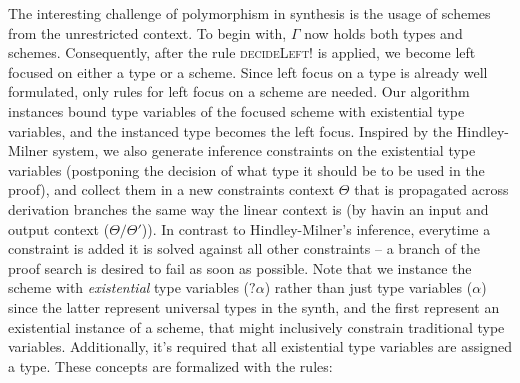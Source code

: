 \documentclass{llncs}
\begin{document}
The interesting challenge of polymorphism in synthesis is the usage of
schemes from the unrestricted context.  To begin with, $\Gamma$ now
holds both types and schemes. Consequently, after the rule
\textsc{decideLeft!} is applied, we become left focused on either a
type or a scheme. Since left focus on a type is already well
formulated, only rules for left focus on a scheme are needed. Our
algorithm instances bound type variables of the focused scheme with
existential type variables, and the instanced type becomes the left
focus. Inspired by the Hindley-Milner system, we also generate
inference constraints on the existential type variables (postponing
the decision of what type it should be to be used in the proof), and
collect them in a new constraints context $\Theta$ that is propagated
across derivation branches the same way the linear context is (by
havin an input and output context ($\Theta/\Theta'$)).  In contrast to
Hindley-Milner's inference, everytime a constraint is added it is solved against all other
constraints -- a branch of the proof search is desired to fail as soon
as possible.
Note that we
instance the scheme with \emph{existential} type variables ($?\alpha$)
rather than just type variables ($\alpha$) since the latter represent universal
types in the synth, and the first represent an existential instance of
a scheme, that might inclusively constrain traditional type
variables. Additionally, it's required that all existential type
variables are assigned a type. These concepts
are formalized with the rules:
\end{document}
